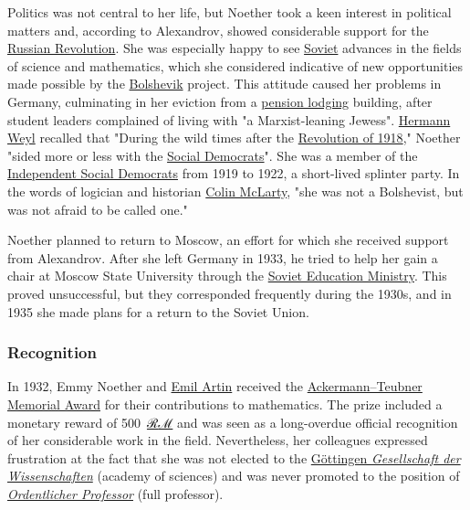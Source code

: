 Politics was not central to her life, but Noether took a keen interest in political matters and, according to Alexandrov, showed considerable support for the \href{https://en.wikipedia.org/wiki/Russian_Revolution}{Russian Revolution}. She was especially happy to see \href{https://en.wikipedia.org/wiki/Soviet}{Soviet} advances in the fields of science and mathematics, which she considered indicative of new opportunities made possible by the \href{https://en.wikipedia.org/wiki/Bolshevik}{Bolshevik} project. This attitude caused her problems in Germany, culminating in her eviction from a \href{https://en.wikipedia.org/wiki/Pension_lodging}{pension lodging} building, after student leaders complained of living with "a Marxist-leaning Jewess". \href{https://en.wikipedia.org/wiki/Hermann_Weyl}{Hermann Weyl} recalled that "During the wild times after the \href{https://en.wikipedia.org/wiki/German_Revolution_of_1918–1919}{Revolution of 1918}," Noether "sided more or less with the \href{https://en.wikipedia.org/wiki/Social_Democratic_Party_of_Germany}{Social Democrats}". She was a member of the \href{https://en.wikipedia.org/wiki/Independent_Social_Democratic_Party_of_Germany}{Independent Social Democrats} from 1919 to 1922, a short-lived splinter party. In the words of logician and historian \href{https://en.wikipedia.org/wiki/Colin_McLarty}{Colin McLarty}, "she was not a Bolshevist, but was not afraid to be called one."

Noether planned to return to Moscow, an effort for which she received support from Alexandrov. After she left Germany in 1933, he tried to help her gain a chair at Moscow State University through the \href{https://en.wikipedia.org/wiki/Narkompros}{Soviet Education Ministry}. This proved unsuccessful, but they corresponded frequently during the 1930s, and in 1935 she made plans for a return to the Soviet Union.


\subsubsection{Recognition}\label{Recognition}

In 1932, Emmy Noether and \href{https://en.wikipedia.org/wiki/Emil_Artin}{Emil Artin} received the \href{https://en.wikipedia.org/wiki/Ackermann–Teubner_Memorial_Award}{Ackermann--Teubner Memorial Award} for their contributions to mathematics. The prize included a monetary reward of {500}{~}\href{https://en.wikipedia.org/wiki/Reichsmark}{ℛ{︁}ℳ{︁}} and was seen as a long-overdue official recognition of her considerable work in the field. Nevertheless, her colleagues expressed frustration at the fact that she was not elected to the \href{https://en.wikipedia.org/wiki/Göttingen_Academy_of_Sciences}{Göttingen \emph{Gesellschaft der Wissenschaften}} (academy of sciences) and was never promoted to the position of \emph{\href{https://en.wikipedia.org/wiki/Ordentlicher_Professor}{Ordentlicher Professor}} (full professor).

